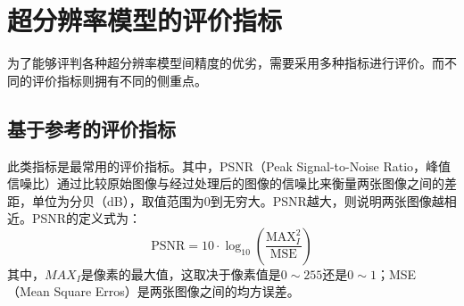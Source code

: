 
\section{超分辨率模型的评价指标}
为了能够评判各种超分辨率模型间精度的优劣，需要采用多种指标进行评价。而不同的评价指标则拥有不同的侧重点。
\subsection{基于参考的评价指标}
此类指标是最常用的评价指标。其中，PSNR（Peak Signal-to-Noise Ratio，峰值信噪比）通过比较原始图像与经过处理后的图像的信噪比来衡量两张图像之间的差距，单位为分贝（dB），取值范围为0到无穷大。PSNR越大，则说明两张图像越相近。PSNR的定义式为：
\begin{equation}
    \text{PSNR}=10\cdot \log_{10}(\frac{\text{MAX}_I^2}{\text{MSE}})
\end{equation}
其中，$MAX_I$是像素的最大值，这取决于像素值是$0\sim 255$还是$0\sim 1$；MSE（Mean Square Erros）是两张图像之间的均方误差。


